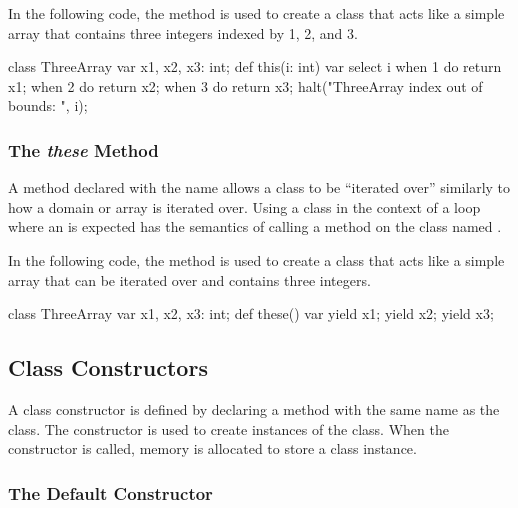 \begin{example}
In the following code, the  method is used to create a
class that acts like a simple array that contains three integers
indexed by 1, 2, and 3.
\begin{chapel}
class ThreeArray {
  var x1, x2, x3: int;
  def this(i: int) var {
    select i {
      when 1 do return x1;
      when 2 do return x2;
      when 3 do return x3;
    }
    halt("ThreeArray index out of bounds: ", i);
  }
}
\end{chapel}
\end{example}

\subsubsection{The {\em these} Method}
\label{The_these_Method}

A method declared with the name  allows a class to be
``iterated over'' similarly to how a domain or array is iterated over.
Using a class in the context of a loop where
an  is expected has the semantics of calling
a method on the class named .

\begin{example}
In the following code, the  method is used to create a
class that acts like a simple array that can be iterated over and
contains three integers.
\begin{chapel}
class ThreeArray {
  var x1, x2, x3: int;
  def these() var {
    yield x1;
    yield x2;
    yield x3;
  }
}
\end{chapel}
\end{example}

\subsection{Class Constructors}
\label{Class_Constructors}

A class constructor is defined by declaring a method with the same
name as the class.  The constructor is used to create instances of the
class.  When the constructor is called, memory is allocated to store a
class instance.

\subsubsection{The Default Constructor}
\label{The_Default_Constructor}

